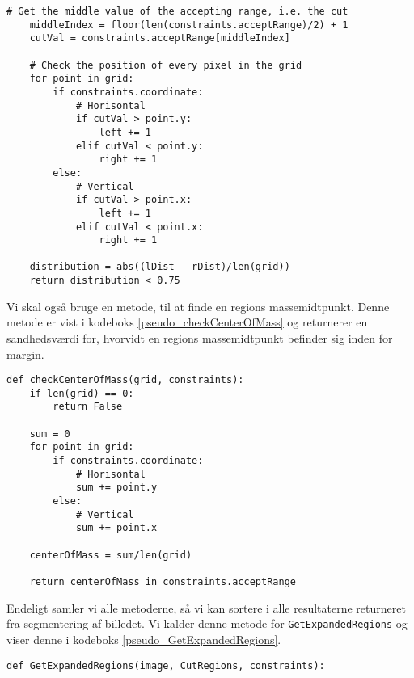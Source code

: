 {\begin{lstlisting}[caption={Metode som, på baggrund af regionens
    fordeling af masse, afgør, om denne region er jævnt fordelt},
    captionpos=b, label={pseudo_distribution}, frame=tb,
    breaklines=false, float]
    # Get the middle value of the accepting range, i.e. the cut
    middleIndex = floor(len(constraints.acceptRange)/2) + 1
    cutVal = constraints.acceptRange[middleIndex]

    # Check the position of every pixel in the grid
    for point in grid:
        if constraints.coordinate:
            # Horisontal
            if cutVal > point.y:
                left += 1
            elif cutVal < point.y:
                right += 1
        else:
            # Vertical
            if cutVal > point.x:
                left += 1
            elif cutVal < point.x:
                right += 1

    distribution = abs((lDist - rDist)/len(grid))
    return distribution < 0.75
\end{lstlisting}

Vi skal også bruge en metode, til at finde en regions massemidtpunkt.
Denne metode er vist i kodeboks \ref{pseudo_checkCenterOfMass} og
returnerer en sandhedsværdi for, hvorvidt en regions massemidtpunkt
befinder sig inden for margin.

\begin{lstlisting}[caption={Metode, som kontrollerer, om en regions
    massemidtpunkt er inden for margin.}, captionpos=b,
    label={pseudo_checkCenterOfMass}, frame=tb, breaklines=false,
    float]
def checkCenterOfMass(grid, constraints):
    if len(grid) == 0:
        return False

    sum = 0
    for point in grid:
        if constraints.coordinate:
            # Horisontal
            sum += point.y
        else:
            # Vertical
            sum += point.x

    centerOfMass = sum/len(grid)

    return centerOfMass in constraints.acceptRange
\end{lstlisting}

Endeligt samler vi alle metoderne, så vi kan sortere i alle resultaterne
returneret fra segmentering af billedet. Vi kalder denne metode for
\texttt{GetExpandedRegions} og viser denne i kodeboks
\ref{pseudo_GetExpandedRegions}.

\begin{lstlisting}[caption={Pseudokode, som returnerer alle interessante
    regioner, der er nævnt fordelt over snittet og har et massemidtpunkt
    inden for margin.},
    captionpos=b, label={pseudo_GetExpandedRegions}, frame=tb, breaklines=false,
    float]
def GetExpandedRegions(image, CutRegions, constraints):


\end{lstlisting}}
